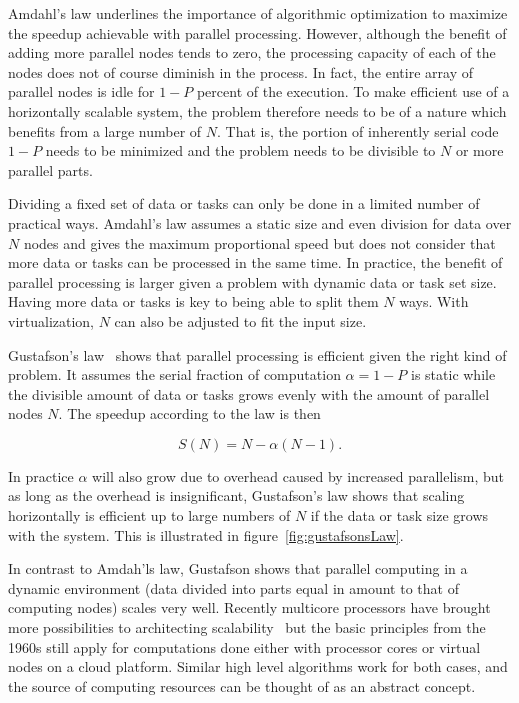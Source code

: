 \documentclass[english]{tktltiki2}
\theoremstyle{definition}
\theoremstyle{remark}
\begin{document}
Amdahl’s law underlines the importance of algorithmic optimization to maximize
the speedup achievable with parallel processing. However, although the benefit
of adding more parallel nodes tends to zero, the processing capacity of each of
the nodes does not of course diminish in the process. In fact, the entire array
of parallel nodes is idle for $1-P$ percent of the execution. To make efficient
use of a horizontally scalable system, the problem therefore needs to be of a
nature which benefits from a large number of $N$. That is, the portion of
inherently serial code $1-P$ needs to be minimized and the problem needs to be
divisible to $N$ or more parallel parts.

Dividing a fixed set of data or tasks can only be done in a limited number of
practical ways. Amdahl’s law assumes a static size and even division for data
over $N$ nodes and gives the maximum proportional speed but does not consider
that more data or tasks can be processed in the same time. In practice, the
benefit of parallel processing is larger given a problem with dynamic data or
task set size. Having more data or tasks is key to being able to split them $N$
ways. With virtualization, $N$ can also be adjusted to fit the input size.

Gustafson’s law~\cite{gustafsonslaw} shows that parallel processing is efficient
given the right kind of problem. It assumes the serial fraction of computation
$\alpha=1-P$ is static while the divisible amount of data or tasks grows evenly
with the amount of parallel nodes $N$. The speedup according to the law is then

\begin{equation}
S(N) = N - \alpha(N-1).
\label{eq:gustafsonslaw}
\end{equation}

In practice $\alpha$ will also grow due to overhead caused by increased
parallelism, but as long as the overhead is insignificant, Gustafson’s law shows
that scaling horizontally is efficient up to large numbers of $N$ if the data or
task size grows with the system. This is illustrated in figure~\ref{fig:gustafsonsLaw}.

In contrast to Amdah’ls law, Gustafson shows that parallel computing in a
dynamic environment (data divided into parts equal in amount to that of
computing nodes) scales very well. Recently multicore processors have brought
more possibilities to architecting scalability~\cite{amhdalmulticore} but the
basic principles from the 1960s still apply for computations done either with
processor cores or virtual nodes on a cloud platform. Similar high level
algorithms work for both cases, and the source of computing resources can be
thought of as an abstract concept.
\end{document}
